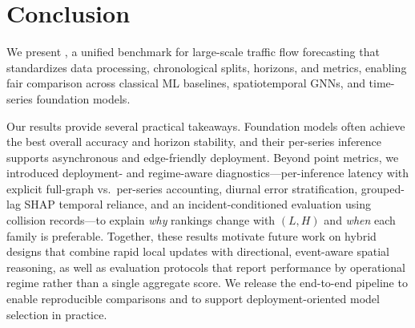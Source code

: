 \documentclass[10pt]{article}
\begin{document}
\section{Conclusion}
\label{sec:conclusion}

We present \LargeST{}, a unified benchmark for large-scale traffic flow forecasting that standardizes data processing, chronological splits, horizons, and metrics, enabling fair comparison across classical ML baselines, spatiotemporal GNNs, and time-series foundation models.


Our results provide several practical takeaways. Foundation models often achieve the best overall accuracy and
horizon stability, and their per-series inference supports asynchronous and edge-friendly deployment. Beyond point metrics, we introduced deployment- and regime-aware diagnostics—per-inference latency with explicit
full-graph vs.\ per-series accounting, diurnal error stratification, grouped-lag SHAP temporal reliance, and an
incident-conditioned evaluation using collision records—to explain \emph{why} rankings change with $(L,H)$ and
\emph{when} each family is preferable. Together, these results motivate future work on hybrid designs that combine
rapid local updates with directional, event-aware spatial reasoning, as well as evaluation protocols that report
performance by operational regime rather than a single aggregate score. We release the end-to-end pipeline to
enable reproducible comparisons and to support deployment-oriented model selection in practice.








\clearpage
\appendix
\end{document}
